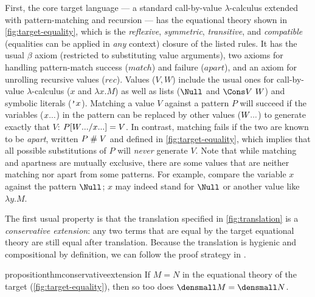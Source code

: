 First, the core target language --- a standard call-by-value $\lambda$-calculus extended with pattern-matching and recursion --- has the equational theory shown in \cref{fig:target-equality}, which is the \emph{reflexive}, \emph{symmetric}, \emph{transitive}, and \emph{compatible} (\ie equalities can be applied in \emph{any} context) closure of the listed rules.
It has the usual $\beta$ axiom (restricted to substituting value arguments), two axioms for handling pattern-match success ($\mathit{match}$) and failure ($\mathit{apart}$), and an axiom for unrolling recursive values ($\mathit{rec}$).
Values ($V, W$) include the usual ones for call-by-value $\lambda$-calculus ($x$ and $\lambda x. M$) as well as lists ($\Null$ and $\Cons V ~ W$) and symbolic literals ($\q x$).
Matching a value $V$ against a pattern $P$ will succeed if the variables ($\many{x}$) in the pattern can be replaced by other values ($\many{W}$) to generate exactly that $V$: $P\subst{\many{x}}{\many{W}} = V$.
In contrast, matching fails if the two are known to be \emph{apart}, written $P \apart V$ and defined in \cref{fig:target-equality}, which implies that all possible substitutions of $P$ will \emph{never} generate $V$.
Note that while matching and apartness are mutually exclusive, there are some values that are neither matching nor apart from some patterns.
For example, compare the variable $x$ against the pattern $\Null$; $x$ may indeed stand for $\Null$ or another value like $\lambda y. M$.

The first usual property is that the translation specified in \cref{fig:translation} is a \emph{conservative extension}: any two terms that are equal by the target equational theory are still equal after translation.
Because the translation is hygienic and compositional by definition,  we can follow the proof strategy in \cite{DownenAriola2014CSCC}.

\begin{restatable}{proposition}{thmconservativeextension}
  \label{thm:conservative-extension}
  If $M = N$ in the equational theory of the target
  (\cref{fig:target-equality}), then so too does $\den{M} = \den{N}$.
\end{restatable}

